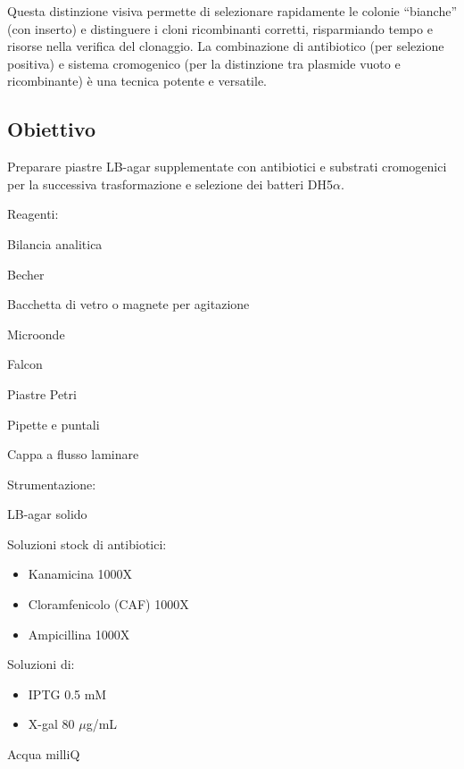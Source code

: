 \vspace{0.5em}

Questa distinzione visiva permette di selezionare rapidamente le colonie “bianche” (con inserto) e distinguere i cloni ricombinanti corretti, risparmiando tempo e risorse nella verifica del clonaggio.
La combinazione di antibiotico (per selezione positiva) e sistema cromogenico (per la distinzione tra plasmide vuoto e ricombinante) è una tecnica potente e versatile.

\newpage
\subsection{Obiettivo}
Preparare piastre LB-agar supplementate con antibiotici e substrati cromogenici per la successiva trasformazione e selezione dei batteri DH5$\alpha$.

  \vspace{1em}
\twoColumnLayout
    {Reagenti:}
    {
      \item Bilancia analitica
      \item Becher
      \item Bacchetta di vetro o magnete per agitazione
      \item Microonde
      \item Falcon
      \item Piastre Petri
      \item Pipette e puntali
      \item Cappa a flusso laminare
    }
  {Strumentazione:}
  {
  \item LB-agar solido
  \item Soluzioni stock di antibiotici:
    \begin{itemize}\footnotesize
      \item Kanamicina 1000X
      \item Cloramfenicolo (CAF) 1000X
      \item Ampicillina 1000X
    \end{itemize}
  \item Soluzioni di:
    \begin{itemize}\footnotesize
      \item IPTG 0.5 mM
      \item X-gal 80 $\mu$g/mL
    \end{itemize}
  \item Acqua milliQ
  }

